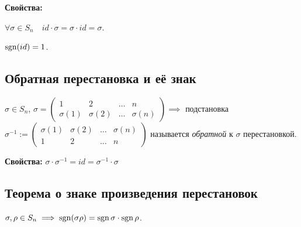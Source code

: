\textbf{Свойства:}

$\forall \sigma \in S_n \quad id \cdot \sigma = \sigma \cdot id = \sigma$.

$\operatorname{\mathop{\mathrm{sgn}}}(id) = 1$.


\subsection{Обратная перестановка и её знак}
\begin{definition}
    $\sigma \in S_n$, $\sigma = \begin{pmatrix}
        1 & 2 & \dots & n \\
        \sigma(1) & \sigma(2) & \dots & \sigma(n)
    \end{pmatrix} \implies$ подстановка $\sigma^{-1} := \begin{pmatrix}
        \sigma(1) & \sigma(2) & \dots & \sigma(n) \\
        1 & 2 & \dots & n
    \end{pmatrix}$ называется \textit{обратной} к $\sigma$ перестановкой.
\end{definition}

\textbf{Свойства:}
$\sigma \cdot \sigma^{-1} = id = \sigma^{-1} \cdot \sigma$

\subsection{Теорема о знаке произведения перестановок}
\begin{theorem}
    $\sigma, \rho \in S_n \implies \operatorname{\mathop{\mathrm{sgn}}}(\sigma \rho) = \operatorname{\mathop{\mathrm{sgn}}} \sigma \cdot \operatorname{\mathop{\mathrm{sgn}}} \rho$.
\end{theorem}

